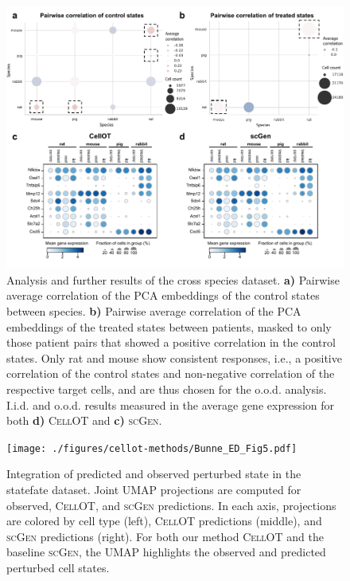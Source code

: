 \begin{figure}[H]
    \centering
    \includegraphics[width=\textwidth]{./figures/cellot-methods/Bunne_ED_Fig4.pdf}
    \caption{Analysis and further results of the cross species dataset. \textbf{a)} Pairwise average correlation of the PCA embeddings of the control states between species. \textbf{b)} Pairwise average correlation of the PCA embeddings of the treated states between patients, masked to only those patient pairs that showed a positive correlation in the control states. Only rat and mouse show consistent responses, i.e., a positive correlation of the control states and non-negative correlation of the respective target cells, and are thus chosen for the o.o.d. analysis. I.i.d. and o.o.d. results measured in the average gene expression for both \textbf{d)} \textsc{CellOT} and \textbf{c)} \textsc{scGen}.}
    \label{supp_fig:crossspecies_ood_analysis}
\end{figure}


\begin{figure}[H]
    \centering
    \texttt{[image: ./figures/cellot-methods/Bunne\_ED\_Fig5.pdf]}
    \caption{
    Integration of predicted and observed perturbed state in the statefate dataset. Joint UMAP projections are computed for observed, \textsc{CellOT}, and \textsc{scGen} predictions. In each axis, projections 
 are colored by cell type (left), \textsc{CellOT} predictions (middle), and \textsc{scGen} predictions (right). For both our method \textsc{CellOT} and the baseline \textsc{scGen}, the UMAP highlights the observed and predicted perturbed cell states.
    }
    \label{supp_fig:statefate_shared_umaps}
\end{figure}


